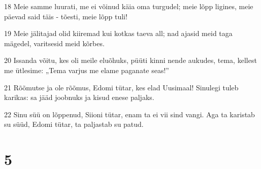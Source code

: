 \par 18 Meie samme luurati, me ei võinud käia oma turgudel; meie lõpp ligines, meie päevad said täis - tõesti, meie lõpp tuli!
\par 19 Meie jälitajad olid kiiremad kui kotkas taeva all; nad ajasid meid taga mägedel, varitsesid meid kõrbes.
\par 20 Issanda võitu, kes oli meile eluõhuks, püüti kinni nende aukudes, tema, kellest me ütlesime: „Tema varjus me elame paganate seas!”
\par 21 Rõõmutse ja ole rõõmus, Edomi tütar, kes elad Uusimaal! Sinulegi tuleb karikas: sa jääd joobnuks ja kisud enese paljaks.
\par 22 Sinu süü on lõppenud, Siioni tütar, enam ta ei vii sind vangi. Aga ta karistab su süüd, Edomi tütar, ta paljastab su patud.

\chapter{5}

